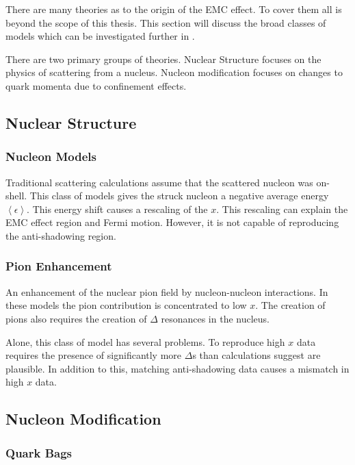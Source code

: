 There are many theories as to the origin of the EMC effect. To cover them all is beyond the scope of this thesis. This section will discuss the broad classes of models which can be investigated further in \cite{Norton,GST,HenSRC}.

There are two primary groups of theories. Nuclear Structure focuses on the physics of scattering from a nucleus. Nucleon modification focuses on changes to quark momenta due to confinement effects.

\subsection{Nuclear Structure}

\subsubsection{Nucleon Models}

Traditional scattering calculations assume that the scattered nucleon was on-shell. This class of models gives the struck nucleon a negative average energy $\left\langle\epsilon\right\rangle$. This energy shift causes a rescaling of the $x$. This rescaling can explain the EMC effect region and Fermi motion. However, it is not capable of reproducing the anti-shadowing region.

\subsubsection{Pion Enhancement}

An enhancement of the nuclear pion field by nucleon-nucleon interactions. In these models the pion contribution is concentrated to low $x$. The creation of pions also requires the creation of $\Delta$ resonances in the nucleus. 

Alone, this class of model has several problems. To reproduce high $x$ data requires the presence of significantly more $\Delta$s than calculations suggest are plausible. In addition to this, matching anti-shadowing data causes a mismatch in high $x$ data.

\subsection{Nucleon Modification}

\subsubsection{Quark Bags}


